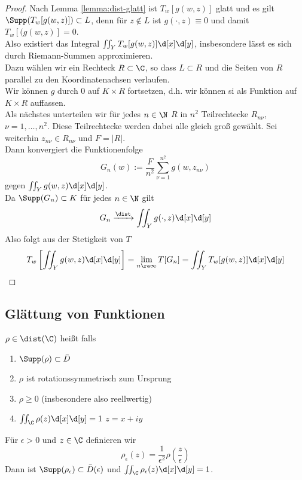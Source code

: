 \begin{proof}
  Nach Lemma \ref{lemma:dist-glatt} ist $T_w[g(w,z)]$ glatt und es
  gilt $\Supp(T_w[g(w,z)]) \subset L$, denn für $z \notin L$ ist
  $g(\cdot, z) \equiv 0$ und damit $T_w[(g(w,z)] = 0$. \\
  Also existiert das Integral $\iint_Y T_w[g(w,z)] \d[x]\d[y]$,
  insbesondere lässt es sich durch Riemann-Summen approximieren. \\
  Dazu wählen wir ein Rechteck $R \subset \C$, so dass $L \subset R$
  und die Seiten von $R$ parallel zu den Koordinatenachsen
  verlaufen. \\
  Wir können $g$ durch 0 auf $K \times R$ fortsetzen, d.h. wir können
  si als Funktion auf $K \times R$ auffassen. \\
  Als nächstes unterteilen wir für jedes $n \in \N$ $R$ in $n^2$
  Teilrechtecke $R_{n\nu}$, $\nu = 1, \dots, n^2$. Diese Teilrechtecke
  werden dabei alle gleich groß gewählt. Sei weiterhin $z_{n\nu}
  \in R_{n \nu}$ und $F = |R|$. \\
  Dann konvergiert die Funktionenfolge
  \[
  G_n(w) := \frac{F}{n^2} \sum_{\nu=1}^{n^2} g(w, z_{n\nu})
  \]
  gegen $\iint_Y g(w,z) \d[x]\d[y]$. \\
  Da $\Supp(G_n) \subset K$ für jedes $n \in \N$ gilt
  \[
  G_n \xrightarrow{\dist} \iint_Y g(\cdot, z) \d[x]\d[y]
  \]
  Also folgt aus der Stetigkeit von $T$
  \[
  T_w \left [ \iint_Y g(w, z) \d[x]\d[y] \right ] = \lim_{n \ra
    \infty} T[G_n] = \iint_Y T_w[g(w,z)] \d[x]\d[y]
  \]
\end{proof}

\subsection{Glättung von Funktionen}
\label{sec:Glättung}

\begin{defin}[Glättungskern]
  $\rho \in \dist(\C)$ heißt  falls
  \begin{enumerate}
  \item $\Supp(\rho) \subset \bar D$
  \item $\rho$ ist rotationssymmetrisch zum Ursprung
  \item $\rho \geq 0$ (insbesondere also reellwertig)
  \item $\iint_\C \rho(z) \d[x]\d[y] = 1$ $z = x + iy$
  \end{enumerate}
  Für $\epsilon > 0$ und $z \in \C$ definieren wir
  \[
  \rho_\epsilon(z) = \frac{1}{\epsilon^2} \rho\left(
    \frac{z}{\epsilon} \right )
  \]
  Dann ist $\Supp(\rho_\epsilon) \subset \bar D(\epsilon)$ und
  $\iint_\C \rho_\epsilon(z) \d[x]\d[y] = 1$.
\end{defin}


